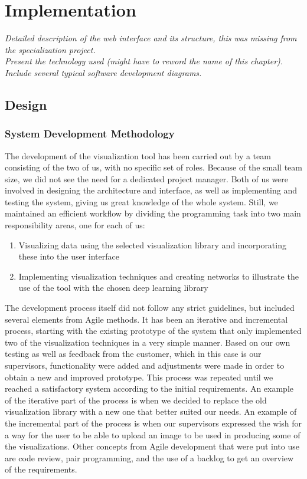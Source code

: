 
\chapter{Implementation}

\textit{Detailed description of the web interface and its structure, this was missing from the specialization project. \\
\noindent Present the technology used (might have to reword the name of this chapter). \\
\noindent Include several typical software development diagrams.}


\section{Design}

\subsection{System Development Methodology}

The development of the visualization tool has been carried out by a team consisting of the two of us, with no specific set of roles. Because of the small team size, we did not see the need for a dedicated project manager. Both of us were involved in designing the architecture and interface, as well as implementing and testing the system, giving us great knowledge of the whole system. Still, we maintained an efficient workflow by dividing the programming task into two main responsibility areas, one for each of us:
\begin{enumerate}
    \item Visualizing data using the selected visualization library and incorporating these into the user interface
    \item Implementing visualization techniques and creating networks to illustrate the use of the tool with the chosen deep learning library
\end{enumerate}

\noindent The development process itself did not follow any strict guidelines, but included several elements from Agile methods. It has been an iterative and incremental process, starting with the existing prototype of the system that only implemented two of the visualization techniques in a very simple manner. Based on our own testing as well as feedback from the customer, which in this case is our supervisors, functionality were added and adjustments were made in order to obtain a new and improved prototype. This process was repeated until we reached a satisfactory system according to the initial requirements. An example of the iterative part of the process is when we decided to replace the old visualization library with a new one that better suited our needs. An example of the incremental part of the process is when our supervisors expressed the wish for a way for the user to be able to upload an image to be used in producing some of the visualizations. Other concepts from Agile development that were put into use are code review, pair programming, and the use of a backlog to get an overview of the requirements.

